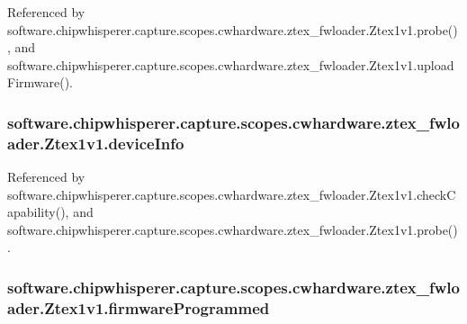 Referenced by software.\+chipwhisperer.\+capture.\+scopes.\+cwhardware.\+ztex\+\_\+fwloader.\+Ztex1v1.\+probe(), and software.\+chipwhisperer.\+capture.\+scopes.\+cwhardware.\+ztex\+\_\+fwloader.\+Ztex1v1.\+upload\+Firmware().

\hypertarget{classsoftware_1_1chipwhisperer_1_1capture_1_1scopes_1_1cwhardware_1_1ztex__fwloader_1_1Ztex1v1_a3269beb85e0438d44fa35926dd987541}{}
\subsubsection[{device\+Info}]{\setlength{\rightskip}{0pt plus 5cm}software.\+chipwhisperer.\+capture.\+scopes.\+cwhardware.\+ztex\+\_\+fwloader.\+Ztex1v1.\+device\+Info}\label{classsoftware_1_1chipwhisperer_1_1capture_1_1scopes_1_1cwhardware_1_1ztex__fwloader_1_1Ztex1v1_a3269beb85e0438d44fa35926dd987541}


Referenced by software.\+chipwhisperer.\+capture.\+scopes.\+cwhardware.\+ztex\+\_\+fwloader.\+Ztex1v1.\+check\+Capability(), and software.\+chipwhisperer.\+capture.\+scopes.\+cwhardware.\+ztex\+\_\+fwloader.\+Ztex1v1.\+probe().

\hypertarget{classsoftware_1_1chipwhisperer_1_1capture_1_1scopes_1_1cwhardware_1_1ztex__fwloader_1_1Ztex1v1_a5da1040a38ae4f68caac84fd8692eb2c}{}
\subsubsection[{firmware\+Programmed}]{\setlength{\rightskip}{0pt plus 5cm}software.\+chipwhisperer.\+capture.\+scopes.\+cwhardware.\+ztex\+\_\+fwloader.\+Ztex1v1.\+firmware\+Programmed}\label{classsoftware_1_1chipwhisperer_1_1capture_1_1scopes_1_1cwhardware_1_1ztex__fwloader_1_1Ztex1v1_a5da1040a38ae4f68caac84fd8692eb2c}


